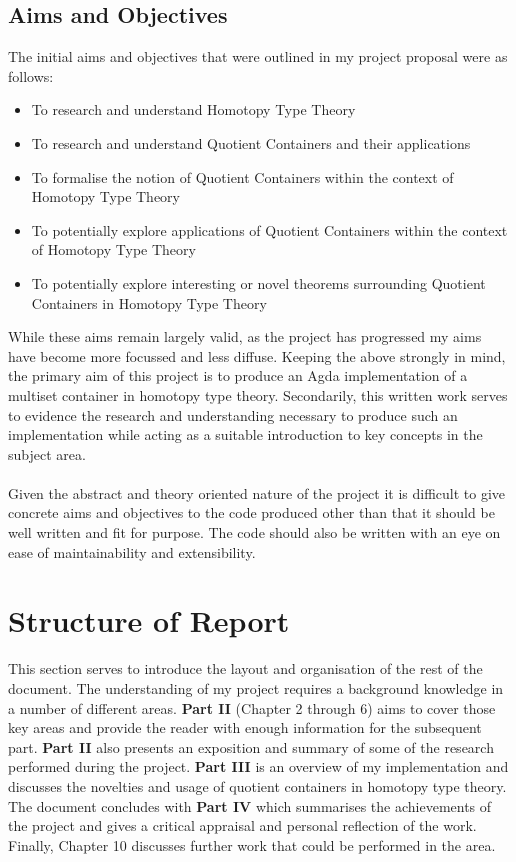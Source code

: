 \documentclass[12pt]{report}
\begin{document}
\subsection{Aims and Objectives}
The initial aims and objectives that were outlined in my project proposal were as follows:
\begin{itemize}
\item To research and understand Homotopy Type Theory
\item To research and understand Quotient Containers and their applications
\item To formalise the notion of Quotient Containers within the context of Homotopy Type Theory
\item To potentially explore applications of Quotient Containers within the context of Homotopy Type Theory
\item To potentially explore interesting or novel theorems surrounding Quotient Containers in Homotopy Type Theory
\end{itemize}

While these aims remain largely valid, as the project has progressed my aims have become more focussed and less diffuse. Keeping the above strongly in mind, the primary aim of this project is to produce an Agda implementation of a multiset container in homotopy type theory. Secondarily, this  written work serves to evidence the research and understanding necessary to produce such an implementation while acting as a suitable introduction to key concepts in the subject area.\\
\\
Given the abstract and theory oriented nature of the project it is difficult to give concrete aims and objectives to the code produced other than that it should be well written and fit for purpose. The code should also be written with an eye on ease of maintainability and extensibility. 

\section{Structure of Report}
This section serves to introduce the layout and organisation of the rest of the document. The understanding of my project requires a background knowledge in a number of different areas. \textbf{Part II} (Chapter 2 through 6) aims to cover those key areas and provide the reader with enough information for the subsequent part. \textbf{Part II} also presents an exposition and summary of some of the research performed during the project. \textbf{Part III} is an overview of my implementation and discusses the novelties and usage of quotient containers in homotopy type theory. The document concludes with \textbf{Part IV} which summarises the achievements of the project and gives a critical appraisal and personal reflection of the work. Finally, Chapter 10 discusses further work that could be performed in the area. 
\end{document}
